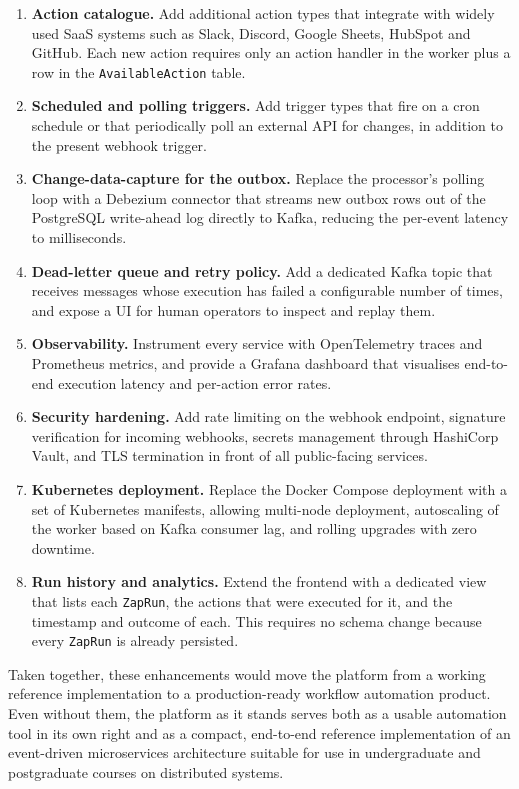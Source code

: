 \begin{enumerate}[label=(\alph*)]
\item \textbf{Action catalogue.} Add additional action types that integrate with widely used SaaS systems such as Slack, Discord, Google Sheets, HubSpot and GitHub. Each new action requires only an action handler in the worker plus a row in the \texttt{AvailableAction} table.
\item \textbf{Scheduled and polling triggers.} Add trigger types that fire on a cron schedule or that periodically poll an external API for changes, in addition to the present webhook trigger.
\item \textbf{Change-data-capture for the outbox.} Replace the processor's polling loop with a Debezium connector that streams new outbox rows out of the PostgreSQL write-ahead log directly to Kafka, reducing the per-event latency to milliseconds.
\item \textbf{Dead-letter queue and retry policy.} Add a dedicated Kafka topic that receives messages whose execution has failed a configurable number of times, and expose a UI for human operators to inspect and replay them.
\item \textbf{Observability.} Instrument every service with OpenTelemetry traces and Prometheus metrics, and provide a Grafana dashboard that visualises end-to-end execution latency and per-action error rates.
\item \textbf{Security hardening.} Add rate limiting on the webhook endpoint, signature verification for incoming webhooks, secrets management through HashiCorp Vault, and TLS termination in front of all public-facing services.
\item \textbf{Kubernetes deployment.} Replace the Docker Compose deployment with a set of Kubernetes manifests, allowing multi-node deployment, autoscaling of the worker based on Kafka consumer lag, and rolling upgrades with zero downtime.
\item \textbf{Run history and analytics.} Extend the frontend with a dedicated view that lists each \texttt{ZapRun}, the actions that were executed for it, and the timestamp and outcome of each. This requires no schema change because every \texttt{ZapRun} is already persisted.
\end{enumerate}

Taken together, these enhancements would move the platform from a working reference implementation to a production-ready workflow automation product. Even without them, the platform as it stands serves both as a usable automation tool in its own right and as a compact, end-to-end reference implementation of an event-driven microservices architecture suitable for use in undergraduate and postgraduate courses on distributed systems.
